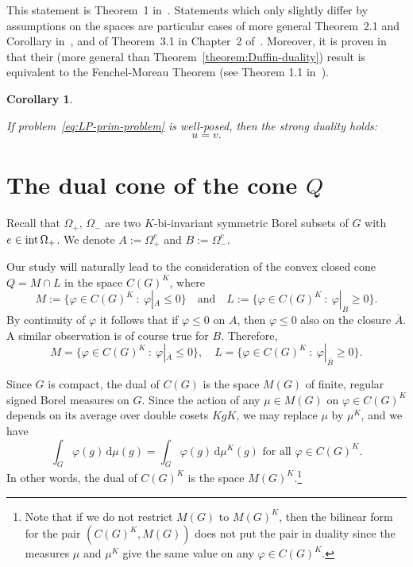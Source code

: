 \documentclass[[a4paper,english,12pt]{amsart}
\theoremstyle{plain}
\newtheorem{corollary}[theorem]{Corollary}
\theoremstyle{remark}
\newcommand{\intt}{\mbox{\rm int\,}}
\newcommand{\ff}{\varphi}
\begin{document}
This statement is Theorem~1 in~\cite{Duffin}. Statements which only slightly differ by assumptions on the spaces are particular cases of more general Theorem~2.1 and Corollary in~\cite{I-T}, and of Theorem~3.1 in Chapter~2 of~\cite{golstein}. Moreover, it is proven in~\cite{I-T} that their (more general than Theorem~\ref{theorem:Duffin-duality}) result is equivalent to the Fenchel-Moreau Theorem (see Theorem 1.1 in~\cite{I-T}). 

\begin{corollary} \label{corollary:Duffin-strong-duality}

If problem~\eqref{eq:LP-prim-problem} is well-posed, then the strong duality holds:
$$
u = v.
$$

\end{corollary}

\section{The dual cone of the cone $Q$} \label{section:Q-polar}

Recall that $\Omega_+$, $\Omega_-$ are two $K$-bi-invariant symmetric Borel subsets of $G$ with $e \in \intt{\Omega_+}$. We denote $A:=\Omega_+^c$ and $B:=\Omega_-^c$.

Our study will naturally lead to the consideration of the convex closed cone $Q = M \cap L$ in the space $C(G)^{K}$, where
\begin{equation} \label{eq:K_and_L}
M  := \{ \ff \in C(G)^K~:~ \ff|_A \le 0\} \quad \text{and} \quad L := \{ \ff\in C(G)^K~:~ \ff|_B\ge 0\}.
\end{equation}
By continuity of $\ff$ it follows that if $\ff \le 0$ on $A$, then $\ff \le 0$ also on the closure $\overline{A}$. A similar observation is of course true for $B$. Therefore,
$$
M = \{ \ff \in C(G)^K~:~ \ff|_{\overline{A}} \le 0\}, \quad L = \{ \ff\in C(G)^K~:~ \ff|_{\overline{B}}\ge 0\}.
$$

Since $G$ is compact, the dual of $C(G)$ is the space  $M(G)$ of finite, regular signed Borel measures on $G$. Since the action of any $\mu \in M(G)$ on $\ff \in C(G)^K$ depends on its average over double cosets $KgK$, we may replace $\mu$ by $\mu^K$, and we have
\begin{equation*}
    \int_{G} \ff(g) \,\mbox{d} \mu(g) = \int_{G} \ff(g) \,\mbox{d}\mu^{K}(g) \text{ for all } \ff \in C(G)^K.
\end{equation*}
In other words, the dual of $C(G)^K$ is the space $M(G)^K$.\footnote{Note that if we do not restrict \(M(G)\) to \(M(G)^K\), then the bilinear form for the pair \((C(G)^K, M(G))\) does not put the pair in duality since the measures \(\mu\) and \(\mu^K\) give the same value on any \(\ff \in C(G)^K\).}
\end{document}
